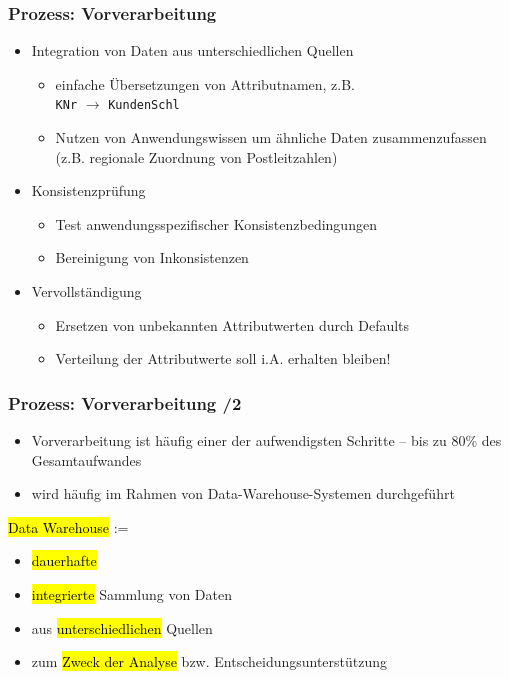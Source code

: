 
\begin{frame}
\frametitle{Prozess: Vorverarbeitung}

\begin{itemize}
\item Integration von Daten aus unterschiedlichen Quellen
\begin{itemize}
\item einfache Übersetzungen  von Attributnamen, z.B.\\
 \texttt{KNr} $\longrightarrow$ \texttt{KundenSchl}
\item Nutzen von Anwendungswissen um ähnliche Daten zusammenzufassen (z.B.
regionale Zuordnung von Postleitzahlen)
\end{itemize}
\item Konsistenzprüfung
\begin{itemize}
\item Test anwendungsspezifischer Konsistenzbedingungen
\item Bereinigung von Inkonsistenzen
\end{itemize}
\item Vervollständigung
\begin{itemize}
\item Ersetzen von unbekannten Attributwerten durch Defaults
\item Verteilung der Attributwerte soll i.A. erhalten bleiben!
\end{itemize}
\end{itemize}

\end{frame}


\begin{frame}
\frametitle{Prozess: Vorverarbeitung /2}

\begin{itemize}
\item Vorverarbeitung ist häufig einer der aufwendigsten Schritte -- bis zu 80\% des Gesamtaufwandes
\item wird häufig im Rahmen von Data-Warehouse-Systemen
durchgeführt
\end{itemize}

\begin{notebox}
\hl{Data Warehouse} :=
\begin{itemize}
\item \hl{dauerhafte}
\item \hl{integrierte} Sammlung von Daten
\item aus \hl{unterschiedlichen} Quellen
\item zum \hl{Zweck der Analyse} bzw. Entscheidungsunterstützung
\end{itemize}
\end{notebox}

\end{frame}

